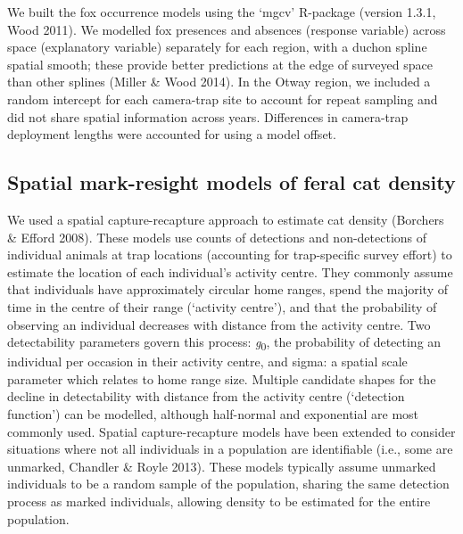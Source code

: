 \documentclass[11pt,a4paper,titlepage,twoside,openright]{style/unimelbthesis}
\begin{document}
\begin{mainmatter}
We built the fox occurrence models using the `mgcv' R-package (version 1.3.1, Wood 2011). We modelled fox presences and absences (response variable) across space (explanatory variable) separately for each region, with a duchon spline spatial smooth; these provide better predictions at the edge of surveyed space than other splines (Miller \& Wood 2014). In the Otway region, we included a random intercept for each camera-trap site to account for repeat sampling and did not share spatial information across years. Differences in camera-trap deployment lengths were accounted for using a model offset.

\hypertarget{density-methods-smr}{%
\subsection{Spatial mark-resight models of feral cat density}\label{density-methods-smr}}

We used a spatial capture-recapture approach to estimate cat density (Borchers \& Efford 2008). These models use counts of detections and non-detections of individual animals at trap locations (accounting for trap-specific survey effort) to estimate the location of each individual's activity centre. They commonly assume that individuals have approximately circular home ranges, spend the majority of time in the centre of their range (`activity centre'), and that the probability of observing an individual decreases with distance from the activity centre. Two detectability parameters govern this process: \emph{g}\textsubscript{0}, the probability of detecting an individual per occasion in their activity centre, and sigma: a spatial scale parameter which relates to home range size. Multiple candidate shapes for the decline in detectability with distance from the activity centre (`detection function') can be modelled, although half-normal and exponential are most commonly used. Spatial capture-recapture models have been extended to consider situations where not all individuals in a population are identifiable (i.e., some are unmarked, Chandler \& Royle 2013). These models typically assume unmarked individuals to be a random sample of the population, sharing the same detection process as marked individuals, allowing density to be estimated for the entire population.


\end{mainmatter}
\end{document}
